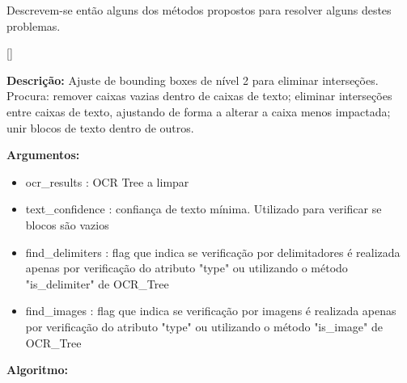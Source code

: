 Descrevem-se então alguns dos métodos propostos para resolver alguns destes problemas.


[\normalsize]

\textbf{Descrição:} Ajuste de bounding boxes de nível 2 para eliminar interseções. Procura: remover caixas vazias dentro de caixas de texto; eliminar interseções entre caixas de texto, ajustando de forma a alterar a caixa menos impactada; unir blocos de texto dentro de outros.

\textbf{Argumentos:}
\begin{itemize}\setlength\itemsep{-0.3em}
	\vspace{-0.5em}
	\item ocr\_results : OCR Tree a limpar
	\item text\_confidence : confiança de texto mínima. Utilizado para verificar se blocos são vazios
	\item find\_delimiters : flag que indica se verificação por delimitadores é realizada apenas por verificação do atributo "type" ou utilizando o método "is\_delimiter" de OCR\_Tree
	\item find\_images : flag que indica se verificação por imagens é realizada apenas por verificação do atributo "type" ou utilizando o método "is\_image" de OCR\_Tree
\end{itemize}

\textbf{Algoritmo:}


